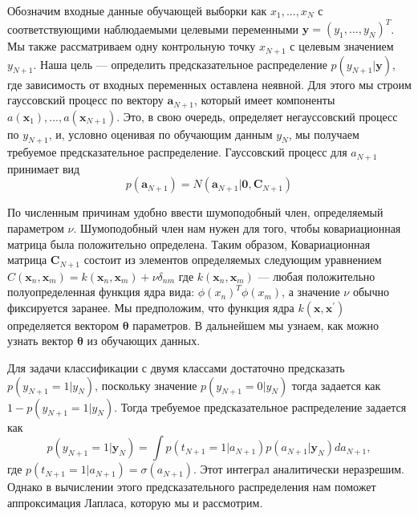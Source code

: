 {Обозначим входные данные обучающей выборки как $x_1,...,x_N$ с соответствующими
наблюдаемыми целевыми переменными $\mathbf{y} =(y_1,...,y_N)^T$. Мы также рассматриваем одну контрольную точку
$x_{N+1}$ с целевым значением $y_{N+1}$. Наша цель — определить предсказательное распределение
$p(y_{N+1}|\mathbf{y})$, где зависимость от входных переменных оставлена неявной. Для этого мы строим гауссовский процесс по вектору $\mathbf{a}_{N+1}$, который имеет компоненты $a(\mathbf{x}_1),...,a(\mathbf{x}_{N+1})$. Это, в свою очередь, определяет негауссовский процесс по $y_{N+1}$,
и, условно оценивая по обучающим данным $y_N$, мы получаем требуемое предсказательное распределение. Гауссовский процесс для $a_{N+1}$ принимает вид
\[ p(\mathbf{a}_{N+1})=N(\mathbf{a}_{N+1}|\mathbf{0},\mathbf{C}_{N+1})\]

По численным причинам удобно ввести шумоподобный член, определяемый
параметром $\nu$. Шумоподобный член нам нужен для того, чтобы ковариационная матрица была положительно определена. Таким образом,
Ковариационная матрица $\mathbf{C}_{N+1}$ состоит из элементов определяемых следующим уравнением $C(\mathbf{x}_n,\mathbf{x}_m)=k(\mathbf{x}_n,\mathbf{x}_m)+\nu\delta_{nm}$
где $k(\mathbf{x}_n,\mathbf{x}_m)$ — любая положительно полуопределенная функция ядра вида: $\phi(x_n)^T\phi(x_m)$, а значение $\nu$ обычно фиксируется заранее. Мы предположим, что
функция ядра $k(\mathbf{x},\mathbf{x}^{\prime})$ определяется вектором $\mathbf{\theta}$ параметров. В дальнейшем мы узнаем, как можно узнать вектор $\mathbf{\theta}$ из обучающих данных.

Для задачи классификации с двумя классами достаточно предсказать $p(y_{N+1} =1|y_{N})$, поскольку
значение $p(y_{N+1} =0|y_{N})$ тогда задается как $1-p(y_{N+1} =1|y_{N})$. Тогда требуемое
предсказательное распределение задается как
\begin{equation}
    p(y_{N+1} =1|\mathbf{y}_{N})= \int p(t_{N+1} =1|a_{N+1})p(a_{N+1}|\mathbf{y}_N)da_{N+1},
\end{equation}
где $p(t_{N+1} =1|a_{N+1})=\sigma(a_{N+1})$. Этот интеграл аналитически неразрешим. Однако в вычислении этого предсказательного распределения нам поможет аппроксимация Лапласа, которую мы и рассмотрим.

}
